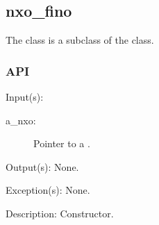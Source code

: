 %
%
%
%
%              

\subsection{nxo\_fino}
\label{nxo_fino}

The  class is a subclass of the  class.

\subsubsection{API}
\begin{capi}
\label{nxo_fino_new}
	\begin{capilist}
	\item[Input(s): ]
		\begin{description}\item[]
		\item[a\_nxo: ]
			Pointer to a .
		\end{description}
	\item[Output(s): ] None.
	\item[Exception(s): ] None.
	\item[Description: ]
		Constructor.
	\end{capilist}
\end{capi}
